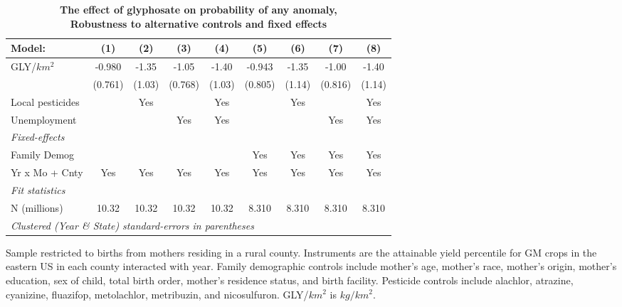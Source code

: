 \begin{table}[htbp]
   \centering
   \small
   \begin{threeparttable}[b]
      \caption{\label{tab:robust-cntrl-any_anomaly-e100myielddiffpercentilegmo} \textbf{The effect of glyphosate on probability of any anomaly, \\ Robustness to alternative controls and fixed effects}}
      \begin{tabular}{lcccccccc}
         \toprule
         Model:           & (1)     & (2)    & (3)     & (4)    & (5)     & (6)    & (7)     & (8)\\  
         \midrule 
         GLY/$km^2$       & -0.980  & -1.35  & -1.05   & -1.40  & -0.943  & -1.35  & -1.00   & -1.40\\   
                          & (0.761) & (1.03) & (0.768) & (1.03) & (0.805) & (1.14) & (0.816) & (1.14)\\   
         Local pesticides &         & Yes    &         & Yes    &         & Yes    &         & Yes\\  
         Unemployment     &         &        & Yes     & Yes    &         &        & Yes     & Yes\\  
         \midrule
         \emph{Fixed-effects}\\
         Family Demog     &         &        &         &        & Yes     & Yes    & Yes     & Yes\\  
         Yr x Mo + Cnty   & Yes     & Yes    & Yes     & Yes    & Yes     & Yes    & Yes     & Yes\\  
         \midrule
         \emph{Fit statistics}\\
         N (millions)     & 10.32   & 10.32  & 10.32   & 10.32  & 8.310   & 8.310  & 8.310   & 8.310\\  
         \midrule
         \multicolumn{9}{l}{\emph{Clustered (Year \& State) standard-errors in parentheses}}\\
      \end{tabular}
      
      \begin{tablenotes}\item Sample restricted to births from mothers residing in a rural county. Instruments are the attainable yield percentile for GM crops in the eastern US in each county interacted with year. Family demographic controls include mother's age, mother's race, mother's origin, mother's education, sex of child, total birth order, mother's residence status, and birth facility. Pesticide controls include alachlor, atrazine, cyanizine, fluazifop, metolachlor, metribuzin, and nicosulfuron. GLY/$km^2$ is $kg/km^2$.
      \end{tablenotes}
   \end{threeparttable}
\end{table}
